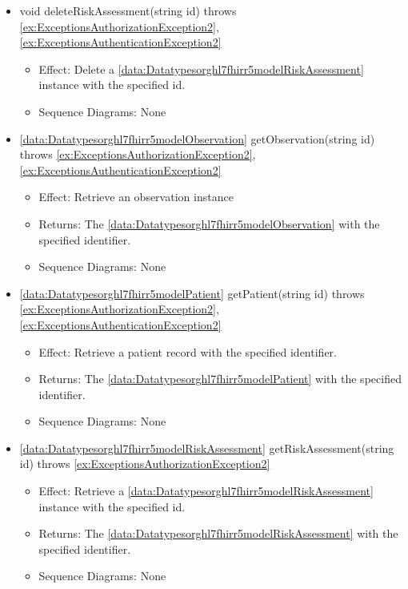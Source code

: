 \begin{description}
\begin{itemize}[noitemsep,nolistsep,leftmargin=-.25cm]
      \item \textsf{void deleteRiskAssessment(string id) throws \ref{ex:ExceptionsAuthorizationException2}, \ref{ex:ExceptionsAuthenticationException2}}
        \begin{itemize}[noitemsep,nolistsep]
           \item Effect: Delete a \ref{data:Datatypesorghl7fhirr5modelRiskAssessment} instance with the specified id. 
           \item Sequence Diagrams: None
        \end{itemize}
      \item \textsf{\ref{data:Datatypesorghl7fhirr5modelObservation} getObservation(string id) throws \ref{ex:ExceptionsAuthorizationException2}, \ref{ex:ExceptionsAuthenticationException2}}
        \begin{itemize}[noitemsep,nolistsep]
           \item Effect: Retrieve an observation instance 
           \item Returns: The \ref{data:Datatypesorghl7fhirr5modelObservation} with the specified identifier.
           \item Sequence Diagrams: None
        \end{itemize}
      \item \textsf{\ref{data:Datatypesorghl7fhirr5modelPatient} getPatient(string id) throws \ref{ex:ExceptionsAuthorizationException2}, \ref{ex:ExceptionsAuthenticationException2}}
        \begin{itemize}[noitemsep,nolistsep]
           \item Effect: Retrieve a patient record with the specified identifier. 
           \item Returns: The \ref{data:Datatypesorghl7fhirr5modelPatient} with the specified identifier.
           \item Sequence Diagrams: None
        \end{itemize}
      \item \textsf{\ref{data:Datatypesorghl7fhirr5modelRiskAssessment} getRiskAssessment(string id) throws \ref{ex:ExceptionsAuthorizationException2}}
        \begin{itemize}[noitemsep,nolistsep]
           \item Effect: Retrieve a \ref{data:Datatypesorghl7fhirr5modelRiskAssessment} instance with the specified id. 
           \item Returns: The \ref{data:Datatypesorghl7fhirr5modelRiskAssessment} with the specified identifier.
           \item Sequence Diagrams: None

\end{itemize}
\end{itemize}
\end{description}
